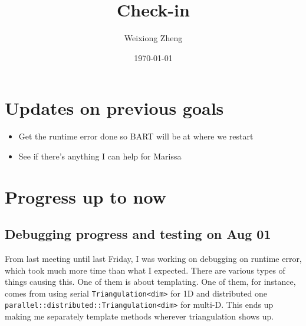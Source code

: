 \documentclass{article}
\title{Check-in} %
\author{Weixiong Zheng} %
\date{\today} %
\begin{document}
\maketitle %

\section{Updates on previous goals}
\begin{itemize}
	\item Get the runtime error done so BART will be at where we restart
	\item See if there's anything I can help for Marissa
\end{itemize}
\section{Progress up to now}
\subsection{Debugging progress and testing on Aug 01}\label{debug}
From last meeting until last Friday, I was working on debugging on runtime error, which took much more time than what I expected. There are various types of things causing this. One of them is about templating. One of them, for instance, comes from using serial {\tt Triangulation<dim>} for 1D and distributed one {\tt parallel::distributed::Triangulation<dim>} for multi-D. This ends up making me separately template methods wherever triangulation shows up.
\end{document}
